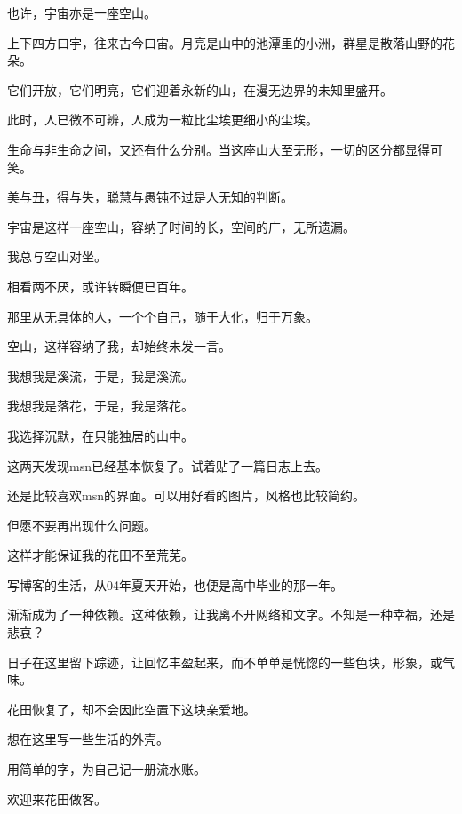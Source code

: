 \documentclass[12pt,a4paper]{article}
\def\blankrev{\vspace{1ex}}									%
\begin{document}
		\blankrev
		也许，宇宙亦是一座空山。\par
		上下四方曰宇，往来古今曰宙。月亮是山中的池潭里的小洲，群星是散落山野的花朵。\par
		它们开放，它们明亮，它们迎着永新的山，在漫无边界的未知里盛开。\par
		此时，人已微不可辨，人成为一粒比尘埃更细小的尘埃。\par
		生命与非生命之间，又还有什么分别。当这座山大至无形，一切的区分都显得可笑。\par
		美与丑，得与失，聪慧与愚钝不过是人无知的判断。\par
		宇宙是这样一座空山，容纳了时间的长，空间的广，无所遗漏。

		\blankrev
		我总与空山对坐。\par
		相看两不厌，或许转瞬便已百年。\par
		那里从无具体的人，一个个自己，随于大化，归于万象。\par
		空山，这样容纳了我，却始终未发一言。

		\blankrev
		我想我是溪流，于是，我是溪流。\par
		我想我是落花，于是，我是落花。

		\blankrev
		我选择沉默，在只能独居的山中。

	\endwriting



		这两天发现msn已经基本恢复了。试着贴了一篇日志上去。\par
		还是比较喜欢msn的界面。可以用好看的图片，风格也比较简约。\par
		但愿不要再出现什么问题。\par
		这样才能保证我的花田不至荒芜。\par
		写博客的生活，从04年夏天开始，也便是高中毕业的那一年。\par
		渐渐成为了一种依赖。这种依赖，让我离不开网络和文字。不知是一种幸福，还是悲哀？\par
		日子在这里留下踪迹，让回忆丰盈起来，而不单单是恍惚的一些色块，形象，或气味。\par
		花田恢复了，却不会因此空置下这块亲爱地。\par
		想在这里写一些生活的外壳。\par
		用简单的字，为自己记一册流水账。

		欢迎来花田做客。

	\endwriting


\end{document}

